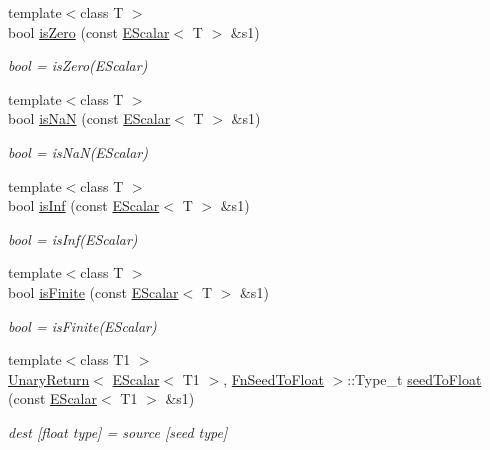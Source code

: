 \begin{DoxyCompactItemize}
{\footnotesize template$<$class T $>$ }\\bool \mbox{\hyperlink{group__escalar_ga114fe2eec1be253ca86ecb5290d189fc}{is\+Zero}} (const \mbox{\hyperlink{classENSEM_1_1EScalar}{E\+Scalar}}$<$ T $>$ \&s1)
\begin{DoxyCompactList}\small\item\em bool = is\+Zero(\+E\+Scalar) \end{DoxyCompactList}\item 
{\footnotesize template$<$class T $>$ }\\bool \mbox{\hyperlink{group__escalar_gada6bc3d89f9c0b0dc55465bdcbb35a78}{is\+NaN}} (const \mbox{\hyperlink{classENSEM_1_1EScalar}{E\+Scalar}}$<$ T $>$ \&s1)
\begin{DoxyCompactList}\small\item\em bool = is\+Na\+N(\+E\+Scalar) \end{DoxyCompactList}\item 
{\footnotesize template$<$class T $>$ }\\bool \mbox{\hyperlink{group__escalar_ga323a3743d3621a1c631ad3e52b85acba}{is\+Inf}} (const \mbox{\hyperlink{classENSEM_1_1EScalar}{E\+Scalar}}$<$ T $>$ \&s1)
\begin{DoxyCompactList}\small\item\em bool = is\+Inf(\+E\+Scalar) \end{DoxyCompactList}\item 
{\footnotesize template$<$class T $>$ }\\bool \mbox{\hyperlink{group__escalar_ga70fcd41007f852c6b90539df7b80af87}{is\+Finite}} (const \mbox{\hyperlink{classENSEM_1_1EScalar}{E\+Scalar}}$<$ T $>$ \&s1)
\begin{DoxyCompactList}\small\item\em bool = is\+Finite(\+E\+Scalar) \end{DoxyCompactList}\item 
{\footnotesize template$<$class T1 $>$ }\\\mbox{\hyperlink{structENSEM_1_1UnaryReturn}{Unary\+Return}}$<$ \mbox{\hyperlink{classENSEM_1_1EScalar}{E\+Scalar}}$<$ T1 $>$, \mbox{\hyperlink{structENSEM_1_1FnSeedToFloat}{Fn\+Seed\+To\+Float}} $>$\+::Type\+\_\+t \mbox{\hyperlink{group__escalar_ga7e479d7cf5ca7620a11e78b407b2e9c3}{seed\+To\+Float}} (const \mbox{\hyperlink{classENSEM_1_1EScalar}{E\+Scalar}}$<$ T1 $>$ \&s1)
\begin{DoxyCompactList}\small\item\em dest \mbox{[}float type\mbox{]} = source \mbox{[}seed type\mbox{]} \end{DoxyCompactList}\item 

\end{DoxyCompactItemize}
